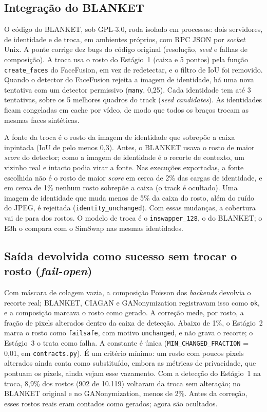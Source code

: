 \subsection{Integração do BLANKET}

O código do BLANKET, sob GPL-3.0, roda isolado em processos: dois servidores, de identidade e de troca, em ambientes próprios, com RPC JSON por \emph{socket} Unix. A ponte corrige dez bugs do código original (resolução, \emph{seed} e falhas de composição). A troca usa o rosto do Estágio~1 (caixa e 5 pontos) pela função \texttt{create\_faces} do FaceFusion, em vez de redetectar, e o filtro de IoU foi removido. Quando o detector do FaceFusion rejeita a imagem de identidade, há uma nova tentativa com um detector permissivo (\texttt{many}, 0,25). Cada identidade tem até 3 tentativas, sobre os 5 melhores quadros do track (\emph{seed candidates}). As identidades ficam congeladas em cache por vídeo, de modo que todos os braços trocam as mesmas faces sintéticas.

A fonte da troca é o rosto da imagem de identidade que sobrepõe a caixa inpintada (IoU de pelo menos 0,3). Antes, o BLANKET usava o rosto de maior \emph{score} do detector; como a imagem de identidade é o recorte de contexto, um vizinho real e intacto podia virar a fonte. Nas execuções exportadas, a fonte escolhida não é o rosto de maior \emph{score} em cerca de 2\% das cargas de identidade, e em cerca de 1\% nenhum rosto sobrepõe a caixa (o track é ocultado). Uma imagem de identidade que muda menos de 5\% da caixa do rosto, além do ruído do JPEG, é rejeitada (\texttt{identity\_unchanged}). Com essas mudanças, a cobertura vai de  para  dos rostos. O modelo de troca é o \texttt{inswapper\_128}, o do BLANKET; o E3h o compara com o SimSwap \citep{simswap} nas mesmas identidades.

\subsection{Saída devolvida como sucesso sem trocar o rosto (\emph{fail-open})}

Com máscara de colagem vazia, a composição Poisson dos \emph{backends} devolvia o recorte real; BLANKET, CIAGAN e GANonymization registravam isso como \texttt{ok}, e a composição marcava o rosto como gerado. A correção mede, por rosto, a fração de pixels alterados dentro da caixa de detecção. Abaixo de 1\%, o Estágio~2 marca o rosto como \texttt{failsafe}, com motivo \texttt{unchanged}, e não grava o recorte; o Estágio~3 o trata como falha. A constante é única (\texttt{MIN\_CHANGED\_FRACTION} = 0,01, em \texttt{contracts.py}). É um critério mínimo: um rosto com poucos pixels alterados ainda conta como substituído, embora as métricas de privacidade, que pontuam os pixels, ainda vejam esse vazamento. Com a detecção do Estágio~1 na troca, 8,9\% dos rostos (902 de 10.119) voltaram da troca sem alteração; no BLANKET original e no GANonymization, menos de 2\%. Antes da correção, esses rostos reais eram contados como gerados; agora são ocultados.

